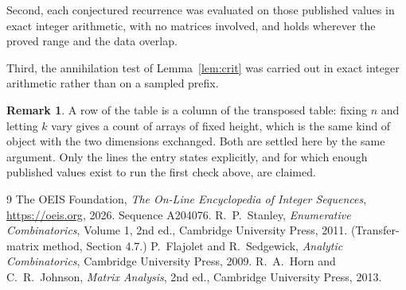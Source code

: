 \documentclass[11pt,a4paper]{article}
\theoremstyle{plain}
\theoremstyle{definition}
\newtheorem{remark}[theorem]{Remark}
\begin{document}
Second, each conjectured recurrence was evaluated on those published values in exact
integer arithmetic, with no matrices involved, and holds wherever the proved range and the
data overlap.

Third, the annihilation test of Lemma~\ref{lem:crit} was carried out in exact integer
arithmetic rather than on a sampled prefix.

\begin{remark}
A row of the table is a column of the transposed table: fixing $n$ and letting $k$ vary gives a
count of arrays of fixed height, which is the same kind of object with the two dimensions
exchanged. Both are settled here by the same argument. Only the lines the entry states
explicitly, and for which enough published values exist to run the first check above, are
claimed.
\end{remark}

\begin{thebibliography}{9}
 The OEIS Foundation, \emph{The On-Line Encyclopedia of Integer
Sequences}, \url{https://oeis.org}, 2026. Sequence A204076.
 R.~P.~Stanley, \emph{Enumerative Combinatorics}, Volume 1, 2nd ed.,
Cambridge University Press, 2011. (Transfer-matrix method, Section 4.7.)
 P.~Flajolet and R.~Sedgewick, \emph{Analytic Combinatorics}, Cambridge
University Press, 2009.
 R.~A.~Horn and C.~R.~Johnson, \emph{Matrix Analysis}, 2nd ed., Cambridge
University Press, 2013.
\end{thebibliography}
\end{document}
